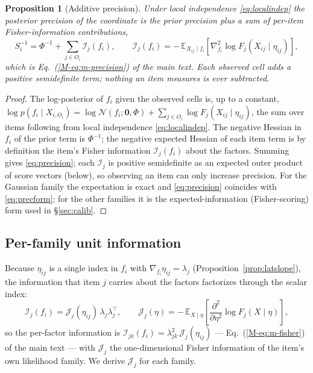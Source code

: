 \documentclass[11pt]{article}
\newcommand{\info}{\mathcal{I}}
\newcommand{\unitinfo}{\mathcal{J}}
\newcommand{\eED}{\mathbb{E}}
\theoremstyle{plain}
\newtheorem{proposition}{Proposition}
\theoremstyle{definition}
\newcommand{\MEq}[1]{Eq.~(\ref{M-#1})}
\begin{document}
\begin{proposition}[Additive precision]\label{prop:additive}
Under local independence \eqref{eq:localindep} the posterior precision of the coordinate is
the prior precision plus a sum of per-item Fisher-information contributions,
\begin{equation}
  S_i^{-1}=\Phi^{-1}+\sum_{j\in O_i}\info_j(f_i),
  \qquad
  \info_j(f_i)=-\,\eED_{X_{ij}\mid f_i}\!\left[\nabla^2_{f_i}\log F_j(X_{ij}\mid\eta_{ij})\right],
  \label{eq:precision}
\end{equation}
which is \MEq{eq:m-precision} of the main text. Each observed cell adds a positive
semidefinite term; nothing an item measures is ever subtracted.
\end{proposition}
\begin{proof}
The log-posterior of $f_i$ given the observed cells is, up to a constant,
$\log p(f_i\mid X_{i,O_i})=\log\mathcal N(f_i;\mathbf 0,\Phi)
+\sum_{j\in O_i}\log F_j(X_{ij}\mid\eta_{ij})$, the sum over items following from local
independence \eqref{eq:localindep}. The negative Hessian in $f_i$ of the prior term is
$\Phi^{-1}$; the negative expected Hessian of each item term is by definition the item's
Fisher information $\info_j(f_i)$ about the factors. Summing gives \eqref{eq:precision}; each
$\info_j$ is positive semidefinite as an expected outer product of score vectors (below), so
observing an item can only increase precision. For the Gaussian family the expectation is
exact and \eqref{eq:precision} coincides with \eqref{eq:precform}; for the other families it
is the expected-information (Fisher-scoring) form used in \S\ref{sec:calib}.
\end{proof}

\subsection{Per-family unit information}
\label{sub:family}

Because $\eta_{ij}$ is a single index in $f_i$ with $\nabla_{f_i}\eta_{ij}=\lambda_j$
(Proposition~\ref{prop:latslope}), the information that item $j$ carries about the factors
factorizes through the scalar index:
\begin{equation}
  \info_j(f_i)=\unitinfo_j(\eta_{ij})\,\lambda_j\lambda_j^{\top},
  \qquad
  \unitinfo_j(\eta)=-\,\eED_{X\mid\eta}\!\left[\frac{\partial^2}{\partial\eta^2}\log F_j(X\mid\eta)\right],
  \label{eq:unitinfo}
\end{equation}
so the per-factor information is $\info_{jk}(f_i)=\lambda_{jk}^{2}\,\unitinfo_j(\eta_{ij})$ ---
\MEq{eq:m-fisher} of the main text --- with $\unitinfo_j$ the one-dimensional Fisher
information of the item's own likelihood family. We derive $\unitinfo_j$ for each family.
\end{document}
